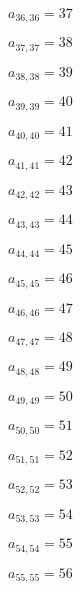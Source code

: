 \documentclass[a4paper,12pt]{article}
\begin{document}
$a _{ 36, 36 } = 37$

$a _{ 37, 37 } = 38$

$a _{ 38, 38 } = 39$

$a _{ 39, 39 } = 40$

$a _{ 40, 40 } = 41$

$a _{ 41, 41 } = 42$

$a _{ 42, 42 } = 43$

$a _{ 43, 43 } = 44$

$a _{ 44, 44 } = 45$

$a _{ 45, 45 } = 46$

$a _{ 46, 46 } = 47$

$a _{ 47, 47 } = 48$

$a _{ 48, 48 } = 49$

$a _{ 49, 49 } = 50$

$a _{ 50, 50 } = 51$

$a _{ 51, 51 } = 52$

$a _{ 52, 52 } = 53$

$a _{ 53, 53 } = 54$

$a _{ 54, 54 } = 55$

$a _{ 55, 55 } = 56$
\end{document}
